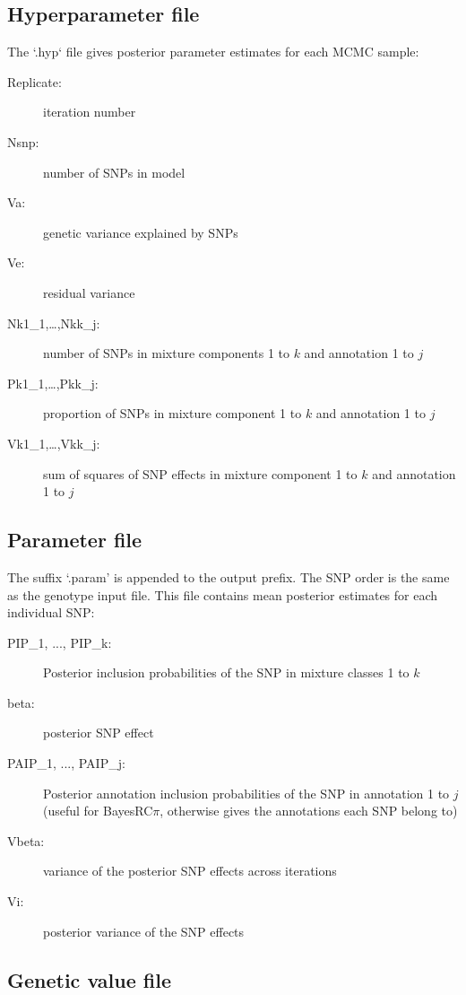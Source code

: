 \documentclass{ol-softwaremanual}
\begin{document}
\subsection{Hyperparameter file}

The ‘.hyp‘ file gives posterior parameter estimates for each MCMC sample: 

\begin{description}
    \item[Replicate:] iteration number
    \item[Nsnp:] number of SNPs in model
    \item[Va:] genetic variance explained by SNPs
    \item[Ve:] residual variance
    \item[Nk1\_1,…,Nkk\_j:] number of SNPs in mixture components 1 to $k$ and annotation 1 to $j$
    \item[Pk1\_1,…,Pkk\_j: ] proportion of SNPs in mixture component 1 to $k$ and annotation 1 to $j$
    \item[Vk1\_1,…,Vkk\_j:] sum of squares of SNP effects in mixture component 1 to $k$ and annotation 1 to $j$
\end{description}


\subsection{Parameter file}

The suffix ‘.param’ is appended to the output prefix. The SNP order is the same as the genotype input file. This file contains mean posterior estimates for each individual SNP:

\begin{description}
    \item[PIP\_1, ..., PIP\_k:] Posterior inclusion probabilities of the SNP in mixture classes 1 to $k$
    \item[beta:] posterior SNP effect 
    \item[PAIP\_1, ..., PAIP\_j:]  Posterior annotation inclusion probabilities of the SNP in annotation 1 to $j$ (useful for BayesRC$\pi$, otherwise gives the annotations each SNP belong to)
    \item[Vbeta:] variance of the posterior SNP effects across iterations
    \item[Vi:] posterior variance of the SNP effects
\end{description}


\subsection{Genetic value file}
\end{document}
